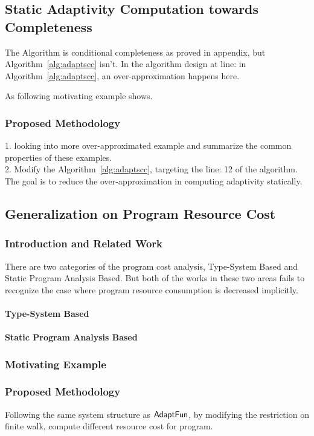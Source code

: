 \subsection{Static Adaptivity Computation towards Completeness}
\label{subsec:furthers-adaptcomplete}
The Algorithm is conditional completeness as proved in appendix, but Algorithm~\ref{alg:adaptscc} isn't.
In the algorithm design at line: in Algorithm~\ref{alg:adaptscc}, an over-approximation happens here. 

As  following motivating example shows.
\subsubsection{Proposed Methodology}
\label{subsubsec:furthers-adaptcomplete-methodology}
%
1. looking into more over-approximated example and summarize the common properties of these examples.
\\
2. Modify the Algorithm~\ref{alg:adaptscc}, targeting the line: 12 of the algorithm. 
The goal is to reduce the over-approximation in computing adaptivity statically.
\subsection{Generalization on Program Resource Cost}
\label{subsec:furthers-cost}

\subsubsection{Introduction and Related Work}
\label{subsubsec:furthers-cost-backgroung}
There are two categories of the program cost analysis, Type-System Based and Static Program Analysis Based. But both of the
works in these two areas fails to recognize the case where program resource consumption is decreased implicitly.
\paragraph*{Type-System Based}
\paragraph*{Static Program Analysis Based}

\subsubsection{Motivating Example}
\label{subsubsec:furthers-cost-example}

\subsubsection{Proposed Methodology}
\label{subsubsec:furthers-cost-methodology}
Following the same system structure as $\textsf{AdaptFun}$,
by modifying the restriction on finite walk, compute different resource cost for program.

